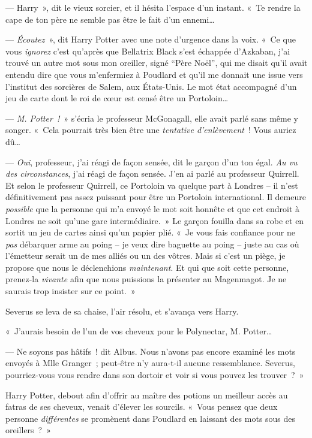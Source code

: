 --- Harry~», dit le vieux sorcier, et il hésita l'espace d'un instant.
«~Te rendre la cape de ton père ne semble pas être le fait d'un ennemi…

--- \emph{Écoutez}~», dit Harry Potter avec une note d'urgence dans la voix.
«~Ce que vous \emph{ignorez} c'est qu'après que Bellatrix Black s'est échappée d'Azkaban, j'ai trouvé un autre mot sous mon oreiller, signé “Père Noël”, qui me disait qu'il avait entendu dire que vous m'enfermiez à Poudlard et qu'il me donnait une issue vers l'institut des sorcières de Salem, aux États-Unis.
Le mot état accompagné d'un jeu de carte dont le roi de cœur est censé être un Portoloin…

--- \emph{M. Potter~!}~» s'écria le professeur McGonagall, elle avait parlé sans même y songer.
«~Cela pourrait très bien être une \emph{tentative d'enlèvement}~!
Vous auriez dû…

--- \emph{Oui}, professeur, j'ai réagi de façon sensée, dit le garçon d'un ton égal.
\emph{Au vu des circonstances}, j'ai réagi de façon sensée.
J'en ai parlé au professeur Quirrell.
Et selon le professeur Quirrell, ce Portoloin va quelque part à Londres -- il n'est définitivement pas assez puissant pour être un Portoloin international.
Il demeure \emph{possible} que la personne qui m'a envoyé le mot soit honnête et que cet endroit à Londres ne soit qu'une gare intermédiaire.~»
Le garçon fouilla dans sa robe et en sortit un jeu de cartes ainsi qu'un papier plié.
«~Je vous fais confiance pour ne \emph{pas} débarquer arme au poing -- je veux dire baguette au poing -- juste au cas où l'émetteur serait un de mes alliés ou un des vôtres.
Mais si c'est un piège, je propose que nous le déclenchions \emph{maintenant}.
Et qui que soit cette personne, prenez-la \emph{vivante} afin que nous puissions la présenter au Magenmagot.
Je ne saurais trop insister sur ce point.~»

Severus se leva de sa chaise, l'air résolu, et s'avança vers Harry.

«~J'aurais besoin de l'un de vos cheveux pour le Polynectar, M. Potter…

--- Ne soyons pas hâtifs~! dit Albus.
Nous n'avons pas encore examiné les mots envoyés à Mlle Granger~; peut-être n'y aura-t-il aucune ressemblance.
Severus, pourriez-vous vous rendre dans son dortoir et voir si vous pouvez les trouver~?~»

Harry Potter, debout afin d'offrir au maître des potions un meilleur accès au fatras de ses cheveux, venait d'élever les sourcils.
«~Vous pensez que deux personne \emph{différentes} se promènent dans Poudlard en laissant des mots sous des oreillers~?~»

